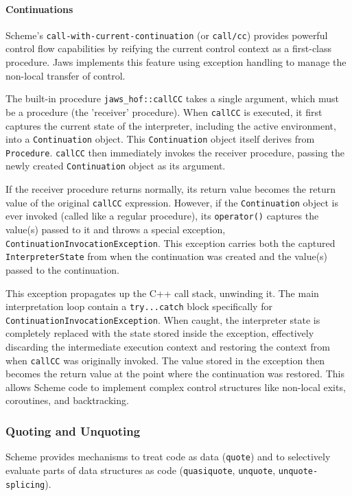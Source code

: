 \documentclass[final]{cmpreport_02}
\begin{document}
\paragraph{Continuations}
Scheme's \texttt{call-with-current-continuation} (or \texttt{call/cc}) provides powerful control flow capabilities by reifying the current control context as a first-class procedure. Jaws implements this feature using exception handling to manage the non-local transfer of control.

The built-in procedure \texttt{jaws\_hof::callCC} takes a single argument, which must be a procedure (the 'receiver' procedure). When \texttt{callCC} is executed, it first captures the current state of the interpreter, including the active environment, into a \texttt{Continuation} object. This \texttt{Continuation} object itself derives from \texttt{Procedure}. \texttt{callCC} then immediately invokes the receiver procedure, passing the newly created \texttt{Continuation} object as its argument.

If the receiver procedure returns normally, its return value becomes the return value of the original \texttt{callCC} expression. However, if the \texttt{Continuation} object is ever invoked (called like a regular procedure), its \texttt{operator()} captures the value(s) passed to it and throws a special exception, \texttt{ContinuationInvocationException}. This exception carries both the captured \texttt{InterpreterState} from when the continuation was created and the value(s) passed to the continuation.

This exception propagates up the C++ call stack, unwinding it. The main interpretation loop contain a \texttt{try...catch} block specifically for \texttt{ContinuationInvocationException}. When caught, the interpreter state is completely replaced with the state stored inside the exception, effectively discarding the intermediate execution context and restoring the context from when \texttt{callCC} was originally invoked. The value stored in the exception then becomes the return value at the point where the continuation was restored. This allows Scheme code to implement complex control structures like non-local exits, coroutines, and backtracking.

\subsubsection{Quoting and Unquoting}

Scheme provides mechanisms to treat code as data (\texttt{quote}) and to selectively evaluate parts of data structures as code (\texttt{quasiquote}, \texttt{unquote}, \texttt{unquote-splicing}).
\end{document}
